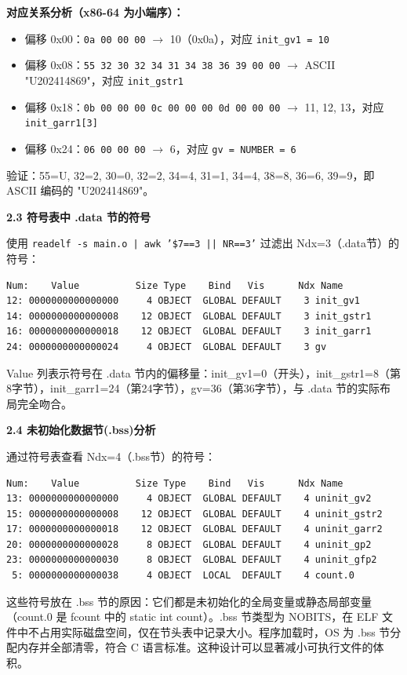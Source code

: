 \documentclass[12pt,a4paper]{ctexart}
\newcommand{\studentid}{U202414869}
\begin{document}
\textbf{对应关系分析（x86-64 为小端序）：}
\begin{itemize}[nosep]
    \item 偏移 0x00：\texttt{0a 00 00 00} $\to$ 10（0x0a），对应 \texttt{init\_gv1 = 10}
    \item 偏移 0x08：\texttt{55 32 30 32 34 31 34 38 36 39 00 00} $\to$ ASCII "\studentid"，对应 \texttt{init\_gstr1}
    \item 偏移 0x18：\texttt{0b 00 00 00 0c 00 00 00 0d 00 00 00} $\to$ 11, 12, 13，对应 \texttt{init\_garr1[3]}
    \item 偏移 0x24：\texttt{06 00 00 00} $\to$ 6，对应 \texttt{gv = NUMBER = 6}
\end{itemize}

验证：55=U, 32=2, 30=0, 32=2, 34=4, 31=1, 34=4, 38=8, 36=6, 39=9，即 ASCII 编码的 "\studentid"。

\textbf{2.3 符号表中 .data 节的符号}

使用 \texttt{readelf -s main.o | awk '\$7==3 || NR==3'} 过滤出 Ndx=3（.data节）的符号：

\begin{lstlisting}
Num:    Value          Size Type    Bind   Vis      Ndx Name
12: 0000000000000000     4 OBJECT  GLOBAL DEFAULT    3 init_gv1
14: 0000000000000008    12 OBJECT  GLOBAL DEFAULT    3 init_gstr1
16: 0000000000000018    12 OBJECT  GLOBAL DEFAULT    3 init_garr1
24: 0000000000000024     4 OBJECT  GLOBAL DEFAULT    3 gv
\end{lstlisting}

Value 列表示符号在 .data 节内的偏移量：init\_gv1=0（开头），init\_gstr1=8（第8字节），init\_garr1=24（第24字节），gv=36（第36字节），与 .data 节的实际布局完全吻合。

\textbf{2.4 未初始化数据节(.bss)分析}

通过符号表查看 Ndx=4（.bss节）的符号：

\begin{lstlisting}
Num:    Value          Size Type    Bind   Vis      Ndx Name
13: 0000000000000000     4 OBJECT  GLOBAL DEFAULT    4 uninit_gv2
15: 0000000000000008    12 OBJECT  GLOBAL DEFAULT    4 uninit_gstr2
17: 0000000000000018    12 OBJECT  GLOBAL DEFAULT    4 uninit_garr2
20: 0000000000000028     8 OBJECT  GLOBAL DEFAULT    4 uninit_gp2
23: 0000000000000030     8 OBJECT  GLOBAL DEFAULT    4 uninit_gfp2
 5: 0000000000000038     4 OBJECT  LOCAL  DEFAULT    4 count.0
\end{lstlisting}

这些符号放在 .bss 节的原因：它们都是未初始化的全局变量或静态局部变量（count.0 是 fcount 中的 static int count）。.bss 节类型为 NOBITS，在 ELF 文件中不占用实际磁盘空间，仅在节头表中记录大小。程序加载时，OS 为 .bss 节分配内存并全部清零，符合 C 语言标准。这种设计可以显著减小可执行文件的体积。
\end{document}
